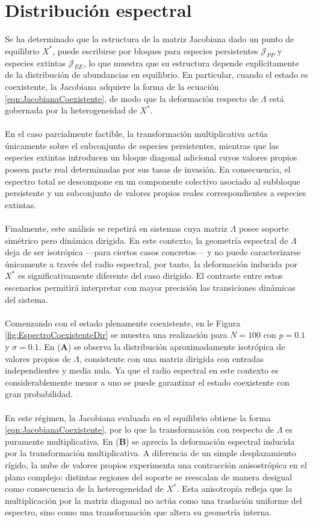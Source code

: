 \section{Distribución espectral} 

Se ha determinado que la estructura de la matriz Jacobiana dado un punto de equilibrio $X^*$, puede escribirse por bloques para especies persistentes $\mathcal{J}_{PP}$ y especies extintas $\mathcal{J}_{EE}$, lo que muestra que su estructura depende explícitamente de la distribución de abundancias en equilibrio. En particular, cuando el estado es coexistente, la Jacobiana adquiere la forma de la ecuación \eqref{eqn:JacobianaCoexistente}, de modo que la deformación respecto de $\Lambda$ está gobernada por la heterogeneidad de $X^*$.
\\
\\
En el caso parcialmente factible, la transformación multiplicativa actúa únicamente sobre el subconjunto de especies persistentes, mientras que las especies extintas introducen un bloque diagonal adicional cuyos valores propios poseen parte real determinadas por sus tasas de invasión. En consecuencia, el espectro total se descompone en un componente colectivo asociado al subbloque persistente y un subconjunto  de valores propios reales correspondientes a especies extintas.
\\
\\
Finalmente, este análisis se repetirá en sistemas cuya matriz $\Lambda$ posee soporte simétrico pero dinámica dirigida. En este contexto, la geometría espectral de $\Lambda$ deja de ser isotrópica ---para ciertos casos concretos--- y no puede caracterizarse únicamente a través del radio espectral, por tanto, la deformación inducida por $X^*$ es significativamente diferente del caso dirigido. El contraste entre estos escenarios permitirá interpretar con mayor precisión las transiciones dinámicas del sistema.
\\
\\
Comenzando con el estado plenamente coexistente, en le Figura \eqref{fig:EspectroCoexistenteDir} se muestra una realización para $N=100$ con $p=0.1$ y $\sigma=0.1$. En (\textbf{A}) se observa la distribución aproximadamente isotrópica de valores propios de $\Lambda$, consistente con una matriz dirigida con entradas independientes y media nula. Ya que el radio espectral en este contexto es considerablemente menor a uno se puede garantizar el estado coexistente con gran probabilidad.
\\
\\
En este régimen, la Jacobiana evaluada en el equilibrio obtiene la forma \eqref{eqn:JacobianaCoexistente}, por lo que la transformación con respecto de $\Lambda$ es puramente multiplicativa. En (\textbf{B}) se aprecia la deformación espectral inducida por la transformación multiplicativa. A diferencia de un simple desplazamiento rígido, la nube de valores propios experimenta una contracción anisostrópica en el plano complejo: distintas regiones del soporte se reescalan de manera desigual como consecuencia de la heterogeneidad de $X^*$. Esta anisotropía refleja que la multiplicación por la matriz diagonal no actúa como una traslación uniforme del espectro, sino como una transformación que altera su geometría interna. 
